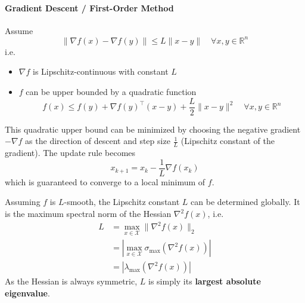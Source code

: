 \paragraph{Gradient Descent / First-Order Method}
Assume
\begin{equation*}
    \|\nabla f(x) - \nabla f(y)\| \leq L \|x - y\| \quad \forall x, y \in \mathbb{R}^n
\end{equation*}
i.e.\
\begin{itemize}
    \item $\nabla f$ is Lipschitz-continuous with constant $L$
    \item $f$ can be upper bounded by a quadratic function
          \begin{equation*}
              f(x) \leq f(y) + \nabla {f(y)}^\top (x - y) + \frac{L}{2} \|x - y\|^2 \quad \forall x, y \in \mathbb{R}^n
          \end{equation*}
\end{itemize}
\newpar{}
This quadratic upper bound can be minimized by choosing the negative gradient $-\nabla f$ as the direction of descent and step size $\frac{1}{L}$ (Lipschitz constant of the gradient). The update rule becomes
\begin{equation*}
    x_{k+1} = x_k - \frac{1}{L} \nabla f(x_k)
\end{equation*}
which is guaranteed to converge to a local minimum of $f$.
\newpar{}

Assuming $f$ is $L$-smooth, the Lipschitz constant $L$ can be determined globally. It is the maximum spectral norm of the Hessian $\nabla^2 f(x)$, i.e.\
\begin{align*}
    L & = \max_{x\in\mathcal{X}} \|\nabla^2 f(x)\|_2            \\
      & = |\max_{x\in\mathcal{X}} \sigma_{\max}(\nabla^2 f(x))| \\
      & = |\lambda_{\max}(\nabla^2 f(x))|
\end{align*}
As the Hessian is always symmetric, $L$ is simply its \textbf{largest absolute eigenvalue}.

